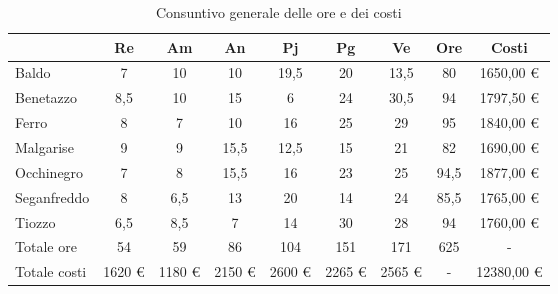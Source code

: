 \begin{table}[!h]
    \centering
    \begin{tabular}{ | l | c | c | c | c | c | c || c | c | }
        \hline
        \textbf{} & \textbf{Re} & \textbf{Am} &\textbf{An} & \textbf{Pj} & \textbf{Pg} & \textbf{Ve} & \textbf{Ore} & \textbf{Costi} \\
        \hline
        Baldo        &    7   &   10   &   10   &   19,5 &   20   &   13,5 &   80   &  1650,00 € \\
        Benetazzo    &    8,5 &   10   &   15   &    6   &   24   &   30,5 &   94   &  1797,50 € \\
        Ferro        &    8   &    7   &   10   &   16   &   25   &   29   &   95   &  1840,00 € \\
        Malgarise    &    9   &    9   &   15,5 &   12,5 &   15   &   21   &   82   &  1690,00 € \\
        Occhinegro   &    7   &    8   &   15,5 &   16   &   23   &   25   &   94,5 &  1877,00 € \\
        Seganfreddo  &    8   &    6,5 &   13   &   20   &   14   &   24   &   85,5 &  1765,00 € \\
        Tiozzo       &    6,5 &    8,5 &    7   &   14   &   30   &   28   &   94   &  1760,00 € \\
        \hline
        Totale ore   &   54   &   59   &   86   &  104   &  151   &  171   &  625   &     -      \\
        \hline
        Totale costi & 1620 € & 1180 € & 2150 € & 2600 € & 2265 € & 2565 € &    -   & 12380,00 € \\
        \hline
    \end{tabular}
    \caption{Consuntivo generale delle ore e dei costi}
\end{table}

\newpage

